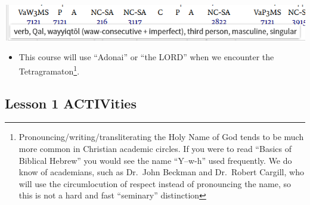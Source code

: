 \documentclass[
]{turabian-researchpaper}
\providecommand{\tightlist}{%
  \setlength{\itemsep}{0pt}\setlength{\parskip}{0pt}}
\begin{document}
\begin{center}\includegraphics[width=400pt]{images/wayyiqtol} \end{center}

\begin{itemize}
\tightlist
\item
  This course will use ``Adonai'' or ``the LORD'' when we encounter the Tetragramaton\footnote{Pronouncing/writing/transliterating the Holy Name of God tends to be much more common in Christian academic circles. If you were to read ``Basics of Biblical Hebrew'' you would see the name ``Y--w-h'' used frequently. We do know of academians, such as Dr.~John Beckman and Dr.~Robert Cargill, who will use the circumlocution of respect instead of pronouncing the name, so this is not a hard and fast ``seminary'' distinction}.
\end{itemize}

\hypertarget{one_8}{%
\subsection{Lesson 1 ACTIVities}\label{one_8}}
\end{document}

